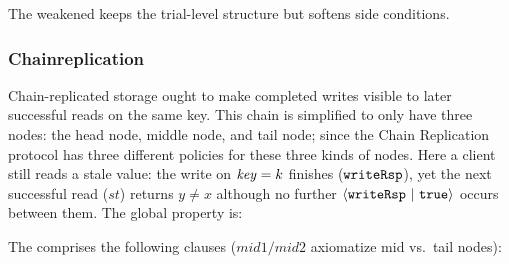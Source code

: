 \vspace{-.4cm}\par\nobreak\noindent
The weakened \tyName{} keeps the trial-level structure but softens side conditions.

\newpage
\subsubsection*{Chainreplication}
Chain-replicated storage ought to make completed writes visible to later successful reads on the same key. This chain is simplified to only have three nodes: the head node, middle node, and tail node; since the Chain Replication protocol has three different policies for these three kinds of nodes. Here a client still reads a stale value: the write on \(\mathit{key}=k\) finishes (\(\boldsymbol{{\tt writeRsp}}\)), yet the next successful read (\(\mathit{st}\)) returns \(y\neq x\) although no further \({\langle} {\boldsymbol{{\tt writeRsp}}~|~{{\tt true}}} {\rangle}\) occurs between them. The global property is:
\vspace{-.35cm}\par{}
\vspace{-.4cm}\par\nobreak\noindent
The \tyName{} comprises the following clauses (\(\mathit{mid1}/\mathit{mid2}\) axiomatize mid vs.\ tail nodes):
